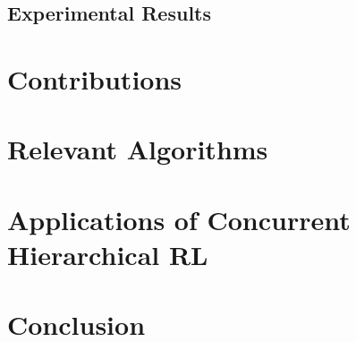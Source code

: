 \documentclass[jair,twoside,11pt,theapa]{article}
\begin{document}
\subsection{Experimental Results}
\label{Experiments}

\section{Contributions}
\label{Contribs}

\section{Relevant Algorithms}
\label{relevant Algors}

\section{Applications of Concurrent Hierarchical RL}
\label{Applications}

\section{Conclusion}
\label{conclusion}

\vskip 0.2in


\end{document}
